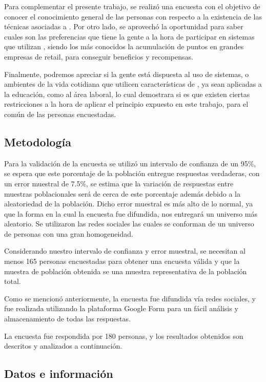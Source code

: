 Para complementar el presente trabajo, se realizó una encuesta con el objetivo de
conocer el conocimiento general de las personas con respecto a la existencia
de las técnicas asociadas a {\GAM}.
Por otro lado, se aprovechó la oportunidad para saber cuales son las preferencias
que tiene la gente a la hora de participar en sistemas que utilizan {\GAM},
siendo los más conocidos la acumulación de puntos en grandes empresas de retail,
para conseguir beneficios y recompensas.

Finalmente, podremos apreciar si la gente está dispuesta al uso de sistemas,
o ambientes de la vida cotidiana que utilicen características de {\GAM},
ya sean aplicadas a la educación, como al área laboral, lo cual demostrara
 si es que existen ciertas restricciones a la hora de aplicar
el principio expuesto en este trabajo, para el común de las personas
encuestadas.

\subsection{Metodología}

Para la validación de la encuesta se utilizó un intervalo de confianza de un 95\%,
se espera que este porcentaje de la población entregue respuestas verdaderas,
con un error muestral de 7.5\%, se estima que la variación de respuestas entre
muestras poblacionales será de cerca de este porcentaje además debido a la
aleatoriedad de la población.
Dicho error muestral es más alto de lo normal, ya que la forma en la cual la
encuesta fue difundida, nos entregará un universo más aleatorio.
Se utilizaron las redes sociales las cuales se conforman de un universo de personas
con una gran homogeneidad.

Considerando nuestro intervalo de confianza y error muestral,
se necesitan al menos 165 personas encuestadas para obtener una encuesta válida
y que la muestra de población obtenida se una muestra representativa de la
población total.

Como se mencionó anteriormente, la encuesta fue difundida vía redes sociales,
y fue realizada utilizando la plataforma Google Form para un fácil análisis y
almacenamiento de todas las respuestas.

La encuesta fue respondida por 180 personas, y los resultados obtenidos son
descritos y analizados a continuación.

\subsection{Datos e información}


